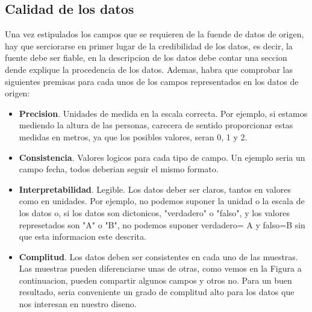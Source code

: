 \subsection{Calidad de los datos}
 
Una vez estipulados los campos que se requieren de la fuende de datos de origen, hay que serciorarse en primer lugar de la credibilidad
de los datos, es decir, la fuente debe ser fiable, en la descripcion de los datos debe contar una seccion dende explique la procedencia
de los datos. Ademas, habra que comprobar las siguientes premisas para cada unos de los campos representados en los datos de origen:
    \begin{itemize}
        \item \textbf{Precision}. Unidades de medida en la escala correcta. Por ejemplo, si estamos mediendo la altura
        de las personas, carecera de sentido proporcionar estas medidas en metros, ya que los posibles valores, seran 0, 1 y 2.
        \item \textbf{Consistencia}. Valores logicos para cada tipo de campo. Un ejemplo seria un campo fecha, todos deberian
        seguir el mismo formato.
        \item \textbf{Interpretabilidad}. Legible. Los datos deber ser claros, tantos en valores como en unidades. Por ejemplo, no podemos
        suponer la unidad o la escala de los datos o, si los datos son dictonicos, "verdadero" o "falso", y los valores represetados son 
        "A" o "B", no podemos suponer verdadero= A y falso=B sin que esta informacion este descrita. 
        \item \textbf{Complitud}. Los datos deben ser consistentes en cada uno de las muestras. Las muestras pueden diferenciarse
        unas de otras, como vemos en la Figura  a continuacion, pueden compartir algunos campos y otros no. Para un buen resultado, seria 
        conveniente un grado de complitud alto para los datos que nos interesan en nuestro diseno.
    \end{itemize}

